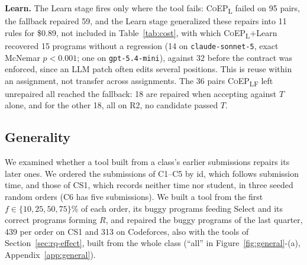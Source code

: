 \documentclass[acmsmall,screen,review,anonymous,nonacm]{acmart}
\newcommand{\coepL}{\textsc{CoEP}\textsubscript{L}\xspace}
\newcommand{\coepLF}{\textsc{CoEP}\textsubscript{LF}\xspace}
\newcommand{\coepLL}{\textsc{CoEP}\textsubscript{L}$+$Learn\xspace}
\newcommand{\cs}{\texttt{claude-sonnet-5}\xspace}
\newcommand{\gm}{\texttt{gpt-5.4-mini}\xspace}
\begin{document}
\textbf{Learn.} The Learn stage fires only where the tool fails: \coepL failed on 95 pairs, the fallback repaired 59, and the Learn stage generalized these repairs into 11 rules for \$0.89, not included in Table~\ref{tab:cost}, with which \coepLL recovered 15 programs without a regression (14 on \cs, exact McNemar $p < 0.001$; one on \gm), against 32 before the contract was enforced, since an LLM patch often edits several positions. This is reuse within an assignment, not transfer across assignments. The 36 pairs \coepLF left unrepaired all reached the fallback: 18 are repaired when accepting against $T$ alone, and for the other 18, all on R2, no candidate passed $T$.

\subsection{Generality}
\label{sec:rq-general}

We examined whether a tool built from a class's earlier submissions repairs its later ones. We ordered the submissions of C1--C5 by id, which follows submission time, and those of CS1, which records neither time nor student, in three seeded random orders (C6 has five submissions). We built a tool from the first $f \in \{10, 25, 50, 75\}\%$ of each order, its buggy programs feeding Select and its correct programs forming $R$, and repaired the buggy programs of the last quarter, 439 per order on CS1 and 313 on Codeforces, also with the tools of Section~\ref{sec:rq-effect}, built from the whole class (``all'' in Figure~\ref{fig:general}-(a), Appendix~\ref{app:general}).
\end{document}
